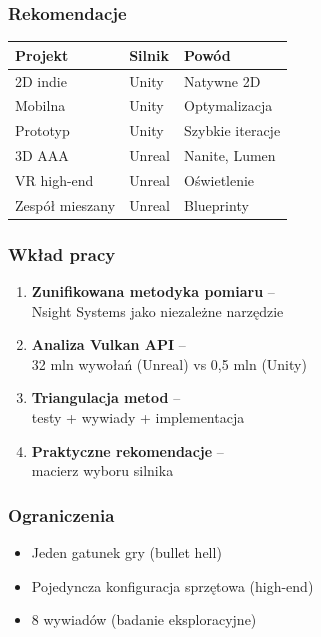 \documentclass{beamer}
\begin{document}
\begin{frame}
  \frametitle{Rekomendacje}
  \begin{table}
    \centering
    \footnotesize
    \renewcommand{\arraystretch}{1.1}
    \begin{tabular}{@{}lll@{}}
      \toprule
      \textbf{Projekt} & \textbf{Silnik} & \textbf{Powód} \\
      \midrule
      2D indie & Unity & Natywne 2D \\
      Mobilna & Unity & Optymalizacja \\
      Prototyp & Unity & Szybkie iteracje \\
      3D AAA & Unreal & Nanite, Lumen \\
      VR high-end & Unreal & Oświetlenie \\
      Zespół mieszany & Unreal & Blueprinty \\
      \bottomrule
    \end{tabular}
  \end{table}
\end{frame}

\begin{frame}
  \frametitle{Wkład pracy}
  \begin{enumerate}
    \item \textbf{Zunifikowana metodyka pomiaru} -- \\ Nsight Systems jako niezależne narzędzie
    \item \textbf{Analiza Vulkan API} -- \\ 32 mln wywołań (Unreal) vs 0,5 mln (Unity)
    \item \textbf{Triangulacja metod} -- \\ testy + wywiady + implementacja
    \item \textbf{Praktyczne rekomendacje} -- \\ macierz wyboru silnika
  \end{enumerate}
\end{frame}

\begin{frame}
  \frametitle{Ograniczenia}
  \begin{itemize}
    \item Jeden gatunek gry (bullet hell)
    \item Pojedyncza konfiguracja sprzętowa (high-end)
    \item 8 wywiadów (badanie eksploracyjne)
  \end{itemize}
\end{frame}
\end{document}
